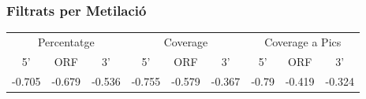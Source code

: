 \documentclass{article}\usepackage[]{graphicx}\usepackage[]{color}
\begin{document}
\subsubsection{Filtrats per Metilació}
\begin{tabular}{ccc|ccc|ccc}
\hline
\multicolumn{3}{c}{Percentatge} &
\multicolumn{3}{c}{Coverage} &
\multicolumn{3}{c}{Coverage a Pics} \\
\cline{1-3}
\cline{4-6}
\cline{7-9}
5' & ORF & 3' & 5' & ORF & 3' & 5' & ORF & 3' \\
\hline
-0.705 & -0.679 & -0.536 &
-0.755 & -0.579 & -0.367 &
-0.79 & -0.419 & -0.324\\
\hline
\end{tabular} \\\\
\end{document}
